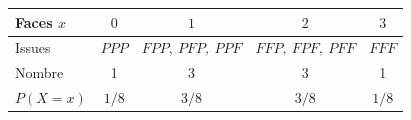 \begingroup\renewcommand{\arraystretch}{1.35}
\small
\begin{tabular}{@{}lcccc@{}}\toprule
Faces $x$ & $0$ & $1$ & $2$ & $3$\\\midrule
Issues & $PPP$ & $FPP,\ PFP,\ PPF$ & $FFP,\ FPF,\ PFF$ & $FFF$\\
Nombre & 1 & 3 & 3 & 1\\
$P(X=x)$ & $1/8$ & $3/8$ & $3/8$ & $1/8$\\
\bottomrule\end{tabular}\endgroup

\par\smallskip{}
